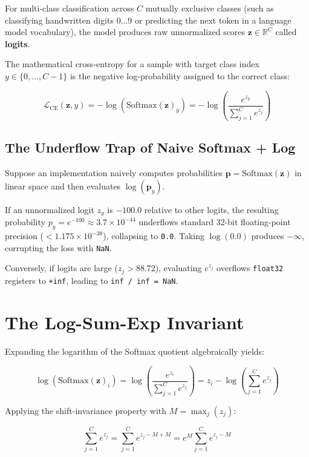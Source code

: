 \documentclass[
  letterpaper,
]{scrbook}
\begin{document}
For multi-class classification across \(C\) mutually exclusive classes
(such as classifying handwritten digits \(0\dots 9\) or predicting the
next token in a language model vocabulary), the model produces raw
unnormalized scores \(\mathbf{z} \in \mathbb{R}^C\) called
\textbf{logits}.

The mathematical cross-entropy for a sample with target class index
\(y \in \{0, \dots, C-1\}\) is the negative log-probability assigned to
the correct class:

\[\mathcal{L}_{\text{CE}}(\mathbf{z}, y) = -\log\left(\text{Softmax}(\mathbf{z})_y\right) = -\log\left(\frac{e^{z_y}}{\sum_{j=1}^C e^{z_j}}\right)\]

\subsection{The Underflow Trap of Naive Softmax +
Log}\label{the-underflow-trap-of-naive-softmax-log}

Suppose an implementation naively computes probabilities
\(\mathbf{p} = \text{Softmax}(\mathbf{z})\) in linear space and then
evaluates \(\log(\mathbf{p}_y)\).

If an unnormalized logit \(z_y\) is \(-100.0\) relative to other logits,
the resulting probability \(p_y = e^{-100} \approx 3.7 \times 10^{-44}\)
underflows standard 32-bit floating-point precision
(\(< 1.175 \times 10^{-38}\)), collapsing to \texttt{0.0}. Taking
\(\log(0.0)\) produces \(-\infty\), corrupting the loss with
\texttt{NaN}.

Conversely, if logits are large (\(z_j > 88.72\)), evaluating
\(e^{z_j}\) overflows \texttt{float32} registers to \texttt{+inf},
leading to \texttt{inf\ /\ inf\ =\ NaN}.

\section{The Log-Sum-Exp Invariant}\label{the-log-sum-exp-invariant}

Expanding the logarithm of the Softmax quotient algebraically yields:

\[\log\left(\text{Softmax}(\mathbf{z})_i\right) = \log\left(\frac{e^{z_i}}{\sum_{j=1}^C e^{z_j}}\right) = z_i - \log\left(\sum_{j=1}^C e^{z_j}\right)\]

Applying the shift-invariance property with \(M = \max_j(z_j)\):

\[\sum_{j=1}^C e^{z_j} = \sum_{j=1}^C e^{z_j - M + M} = e^M \sum_{j=1}^C e^{z_j - M}\]
\end{document}
